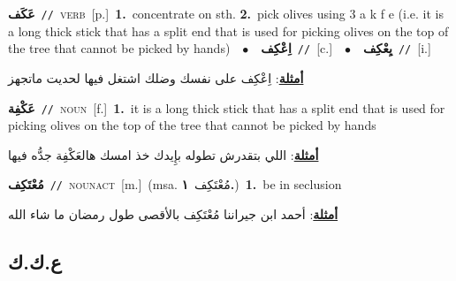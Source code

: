 \documentclass[10pt,a4paper,twoside]{article} %
\begin{document}
\begin{multicols}{2}
{\setlength\topsep{0pt}\textbf{\foreignlanguage{arabic}{عَكَف}}\ {\color{gray}\texttt{//}\color{black}}\ \textsc{verb}\ [p.]\ \textbf{1.}~concentrate on sth.  \textbf{2.}~pick olives using 3 a k f e (i.e. it is a long thick stick that has a split end that is used for picking olives on the top of the tree that cannot be picked by hands)\ \ $\bullet$\ \ \setlength\topsep{0pt}\textbf{\foreignlanguage{arabic}{اِعْكِف}}\ {\color{gray}\texttt{//}\color{black}}\ [c.]\ \ $\bullet$\ \ \setlength\topsep{0pt}\textbf{\foreignlanguage{arabic}{يِعْكِف}}\ {\color{gray}\texttt{//}\color{black}}\ [i.]\  \begin{flushright}\color{gray}\foreignlanguage{arabic}{\textbf{\underline{\foreignlanguage{arabic}{أمثلة}}}: اِعْكِف على نفسك وضلك اشتغل فيها لحديت ماتجهز}\end{flushright}\color{black}} \vspace{2mm}

{\setlength\topsep{0pt}\textbf{\foreignlanguage{arabic}{عَكْفِة}}\ {\color{gray}\texttt{//}\color{black}}\ \textsc{noun}\ [f.]\ \textbf{1.}~it is a long thick stick that has a split end that is used for picking olives on the top of the tree that cannot be picked by hands\  \begin{flushright}\color{gray}\foreignlanguage{arabic}{\textbf{\underline{\foreignlanguage{arabic}{أمثلة}}}: اللي بتقدرش تطوله بإِيدك خذ امسك هالعَكْفِة جدُّه فيها}\end{flushright}\color{black}} \vspace{2mm}

{\setlength\topsep{0pt}\textbf{\foreignlanguage{arabic}{مُعْتَكِف}}\ {\color{gray}\texttt{//}\color{black}}\ \textsc{noun\textunderscore act}\ [m.]\ \color{gray}(msa. \foreignlanguage{arabic}{مُعْتَكِف}~\foreignlanguage{arabic}{\textbf{١.}})\color{black}\ \textbf{1.}~be in seclusion\  \begin{flushright}\color{gray}\foreignlanguage{arabic}{\textbf{\underline{\foreignlanguage{arabic}{أمثلة}}}: أحمد ابن جيراننا مُعْتَكِف بالأقصى طول رمضان ما شاء الله}\end{flushright}\color{black}} \vspace{2mm}

\vspace{-3mm}
\subsection*{\color{blue}\foreignlanguage{arabic}{ع.ك.ك}\color{blue}{}} 


\end{multicols}
\end{document}
